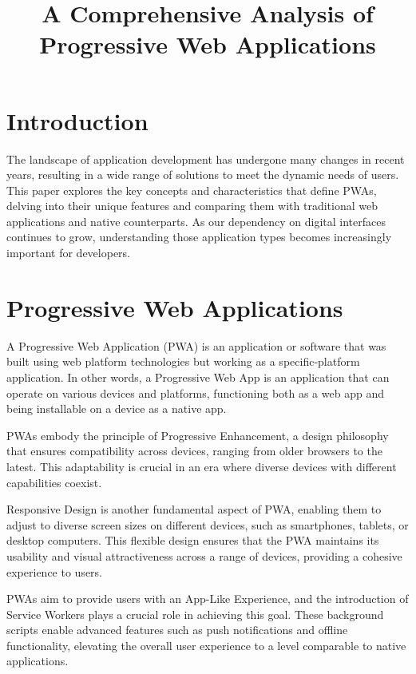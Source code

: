 \documentclass[conference]{IEEEtran}
\begin{document}
\title{A Comprehensive Analysis of Progressive Web Applications}

\author{
}

\maketitle

\section*{Introduction}
The landscape of application development has undergone many changes in recent years, resulting in a wide range of solutions to meet the dynamic needs of users. This paper explores the key concepts and characteristics that define PWAs, delving into their unique features and comparing them with traditional web applications and native counterparts. As our dependency on digital interfaces continues to grow, understanding those application types becomes increasingly important for developers.
\section{Progressive Web Applications}
A Progressive Web Application (PWA) is an application or software that was built using web platform technologies but working as a specific-platform application.
In other words, a Progressive Web App is an application that can operate on various devices and platforms, functioning both as a web app and being installable on a device as a native app.

PWAs embody the principle of Progressive Enhancement, a design philosophy that ensures compatibility across devices, ranging from older browsers to the latest. This adaptability is crucial in an era where diverse devices with different capabilities coexist. 

Responsive Design is another fundamental aspect of PWA, enabling them to adjust to diverse screen sizes on different devices, such as smartphones, tablets, or desktop computers. This flexible design ensures that the PWA maintains its usability and visual attractiveness across a range of devices, providing a cohesive experience to users.

PWAs aim to provide users with an App-Like Experience, and the introduction of Service Workers plays a crucial role in achieving this goal. These background scripts enable advanced features such as push notifications and offline functionality, elevating the overall user experience to a level comparable to native applications.
\end{document}
